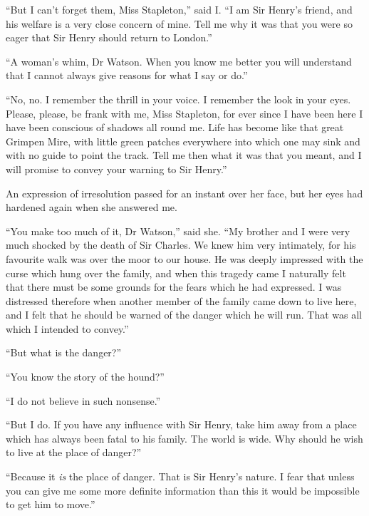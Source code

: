 \documentclass[paper=5.5in:8.5in,BCOR=7mm,twoside,DIV=calc,12pt,usegeometry,openany,chapterprefix,endperiod,headings=big]{scrbook} %
\begin{document}
\enquote{But I can't forget them, Miss Stapleton,} said I. \enquote{I am Sir Hen\-ry's friend, and his welfare is a very close concern of mine. Tell me why it was that you were so eager that Sir Henry should return to London.}

\enquote{A woman's whim, Dr Watson. When you know me better you will understand that I cannot always give reasons for what I say or do.}

\enquote{No, no. I remember the thrill in your voice. I remember the look in your eyes. Please, please, be frank with me, Miss Stapleton, for ever since I have been here I have been conscious of shadows all round me. Life has become like that great Grimpen Mire, with little green patches everywhere into which one may sink and with no guide to point the track. Tell me then what it was that you meant, and I will promise to convey your warning to Sir Henry.}

An expression of irresolution passed for an instant over her face, but her eyes had hardened again when she answered me.

\enquote{You make too much of it, Dr Watson,} said she. \enquote{My brother and I were very much shocked by the death of Sir Charles. We knew him very intimately, for his favourite walk was over the moor to our house. He was deeply impressed with the curse which hung over the family, and when this tragedy came I naturally felt that there must be some grounds for the fears which he had expressed. I was distressed therefore when another member of the family came down to live here, and I felt that he should be warned of the danger which he will run. That was all which I intended to convey.}

\enquote{But what is the danger?}

\enquote{You know the story of the hound?}


\enquote{I do not believe in such nonsense.}

\enquote{But I do. If you have any influence with Sir Henry, take him away from a place which has always been fatal to his family. The world is wide. Why should he wish to live at the place of danger?}

\enquote{Because it \textit{is} the place of danger. That is Sir Henry's nature. I fear that unless you can give me some more definite information than this it would be impossible to get him to move.}
\end{document}
